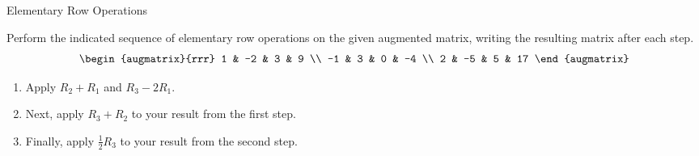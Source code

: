 \documentclass{article}
\begin{document}
\vspace{6pt}
\begin{activity} Elementary Row Operations

Perform the indicated sequence of elementary row operations on the given augmented matrix, writing the resulting matrix after each step.
\[
\begin{augmatrix}{rrr}
  1 & -2 & 3 & 9 \\
  -1 & 3 & 0 & -4 \\
  2 & -5 & 5 & 17
\end{augmatrix}
\]
\begin{enumerate}
  \item Apply \(R_2 + R_1\) and \(R_3 - 2R_1\).
  \item Next, apply \(R_3 + R_2\) to your result from the first step.
  \item Finally, apply \(\frac{1}{2}R_3\) to your result from the second step.
\end{enumerate}
\end{activity}
\end{document}
